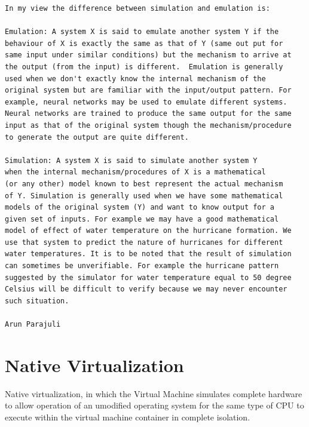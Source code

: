 \begin{verbatim}
In my view the difference between simulation and emulation is:

Emulation: A system X is said to emulate another system Y if the
behaviour of X is exactly the same as that of Y (same out put for
same input under similar conditions) but the mechanism to arrive at
the output (from the input) is different.  Emulation is generally
used when we don't exactly know the internal mechanism of the
original system but are familiar with the input/output pattern. For
example, neural networks may be used to emulate different systems.
Neural networks are trained to produce the same output for the same
input as that of the original system though the mechanism/procedure
to generate the output are quite different.

Simulation: A system X is said to simulate another system Y
when the internal mechanism/procedures of X is a mathematical
(or any other) model known to best represent the actual mechanism
of Y. Simulation is generally used when we have some mathematical
models of the original system (Y) and want to know output for a
given set of inputs. For example we may have a good mathematical
model of effect of water temperature on the hurricane formation. We
use that system to predict the nature of hurricanes for different
water temperatures. It is to be noted that the result of simulation
can sometimes be unverifiable. For example the hurricane pattern
suggested by the simulator for water temperature equal to 50 degree
Celsius will be difficult to verify because we may never encounter
such situation.

Arun Parajuli
\end{verbatim}


\section{Native Virtualization}
\label{sec:intro:intro:native}

Native virtualization, in which the Virtual Machine simulates complete hardware
to allow operation of an umodified operating system for the same type of CPU to
execute within the virtual machine container in complete isolation.

